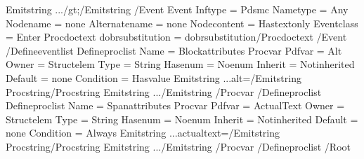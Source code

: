 \documentclass[letterpaper,12pt,english,openany,oneside]{sphinxmanual}
\begin{document}
\begin{sphinxVerbatim}[commandchars=\\\{\}]
      \PYGZlt{}Emit\PYGZhy{}string ...\PYGZgt{}/\PYGZam{}gt;\PYGZlt{}/Emit\PYGZhy{}string\PYGZgt{}
    \PYGZlt{}/Event\PYGZgt{}
    \PYGZlt{}Event  Inf\PYGZhy{}type = \PYGZdq{}Pds\PYGZhy{}mc\PYGZdq{} Name\PYGZhy{}type = \PYGZdq{}Any\PYGZdq{} Node\PYGZhy{}name = \PYGZdq{}\PYGZhy{}none\PYGZhy{}\PYGZdq{}
            Alternate\PYGZhy{}name = \PYGZdq{}\PYGZhy{}none\PYGZhy{}\PYGZdq{} Node\PYGZhy{}content = \PYGZdq{}Has\PYGZhy{}text\PYGZhy{}only\PYGZdq{}
            Event\PYGZhy{}class = \PYGZdq{}Enter\PYGZdq{}\PYGZgt{}
      \PYGZlt{}Proc\PYGZhy{}doc\PYGZhy{}text do\PYGZhy{}br\PYGZhy{}substitution = \PYGZdq{}do\PYGZhy{}br\PYGZhy{}substitution\PYGZdq{}\PYGZgt{}\PYGZlt{}/Proc\PYGZhy{}doc\PYGZhy{}text\PYGZgt{}
    \PYGZlt{}/Event\PYGZgt{}
  \PYGZlt{}/Define\PYGZhy{}event\PYGZhy{}list\PYGZgt{}
  \PYGZlt{}Define\PYGZhy{}proc\PYGZhy{}list Name = \PYGZdq{}Block\PYGZhy{}attributes\PYGZdq{}\PYGZgt{}
    \PYGZlt{}Proc\PYGZhy{}var  Pdf\PYGZhy{}var = \PYGZdq{}Alt\PYGZdq{} Owner = \PYGZdq{}Structelem\PYGZdq{} Type = \PYGZdq{}String\PYGZdq{}
              Has\PYGZhy{}enum = \PYGZdq{}No\PYGZhy{}enum\PYGZdq{} Inherit = \PYGZdq{}Not\PYGZhy{}inherited\PYGZdq{} Default = \PYGZdq{}\PYGZhy{}none\PYGZhy{}\PYGZdq{}
              Condition = \PYGZdq{}Has\PYGZhy{}value\PYGZdq{}\PYGZgt{}
      \PYGZlt{}Emit\PYGZhy{}string ...\PYGZgt{}alt=\PYGZdq{}\PYGZlt{}/Emit\PYGZhy{}string\PYGZgt{}
      \PYGZlt{}Proc\PYGZhy{}string\PYGZgt{}\PYGZlt{}/Proc\PYGZhy{}string\PYGZgt{}
      \PYGZlt{}Emit\PYGZhy{}string ...\PYGZgt{}\PYGZdq{}\PYGZlt{}/Emit\PYGZhy{}string\PYGZgt{}
    \PYGZlt{}/Proc\PYGZhy{}var\PYGZgt{}
  \PYGZlt{}/Define\PYGZhy{}proc\PYGZhy{}list\PYGZgt{}
  \PYGZlt{}Define\PYGZhy{}proc\PYGZhy{}list Name = \PYGZdq{}Span\PYGZhy{}attributes\PYGZdq{}\PYGZgt{}
    \PYGZlt{}Proc\PYGZhy{}var  Pdf\PYGZhy{}var = \PYGZdq{}ActualText\PYGZdq{} Owner = \PYGZdq{}Structelem\PYGZdq{} Type = \PYGZdq{}String\PYGZdq{}
              Has\PYGZhy{}enum = \PYGZdq{}No\PYGZhy{}enum\PYGZdq{} Inherit = \PYGZdq{}Not\PYGZhy{}inherited\PYGZdq{} Default = \PYGZdq{}\PYGZhy{}none\PYGZhy{}\PYGZdq{}
              Condition = \PYGZdq{}Always\PYGZdq{}\PYGZgt{}
      \PYGZlt{}Emit\PYGZhy{}string ...\PYGZgt{}actual\PYGZhy{}text=\PYGZdq{}\PYGZlt{}/Emit\PYGZhy{}string\PYGZgt{}
      \PYGZlt{}Proc\PYGZhy{}string\PYGZgt{}\PYGZlt{}/Proc\PYGZhy{}string\PYGZgt{}
      \PYGZlt{}Emit\PYGZhy{}string ...\PYGZgt{}\PYGZdq{}\PYGZlt{}/Emit\PYGZhy{}string\PYGZgt{}
    \PYGZlt{}/Proc\PYGZhy{}var\PYGZgt{}
  \PYGZlt{}/Define\PYGZhy{}proc\PYGZhy{}list\PYGZgt{}
\PYGZlt{}/Root\PYGZgt{}
\end{sphinxVerbatim}
\end{document}
